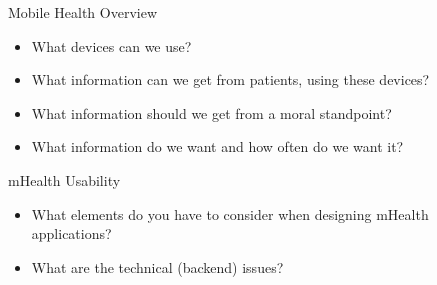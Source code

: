 \documentclass[10pt, xcolor=table]{beamer}
\begin{document}
\begin{frame}{Mobile Health Overview }
	\begin{itemize}[<+(0)->]
		\item What devices can we use?
		\item What information can we get from patients, using these devices?
		\item What information should we get from a moral standpoint?
		\item What information do we want and how often do we want it?
	\end{itemize}
\end{frame}


\begin{frame}{mHealth Usability}
	\begin{itemize}
		\item What elements do you have to consider when designing mHealth applications? 
		\item What are the technical (backend) issues?
	\end{itemize}
\end{frame}

\end{document}
